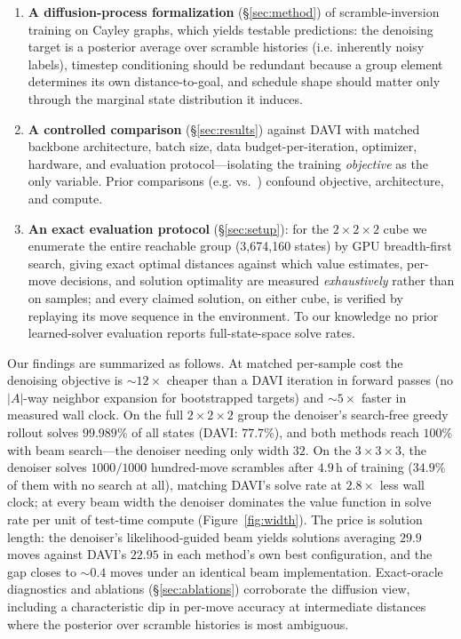 \documentclass[11pt]{article}
\newcommand{\ie}{i.e.}
\newcommand{\eg}{e.g.}
\begin{document}
\begin{enumerate}
\item \textbf{A diffusion-process formalization} (\S\ref{sec:method}) of
scramble-inversion training on Cayley graphs, which yields testable
predictions: the denoising target is a posterior average over scramble
histories (\ie{} inherently noisy labels), timestep conditioning should be
redundant because a group element determines its own distance-to-goal, and
schedule shape should matter only through the marginal state distribution it
induces.
\item \textbf{A controlled comparison} (\S\ref{sec:results}) against DAVI with
matched backbone architecture, batch size, data budget-per-iteration,
optimizer, hardware, and evaluation protocol---isolating the training
\emph{objective} as the only variable. Prior comparisons (\eg{}
\citealp{takano2023} vs.\ \citealp{agostinelli2019}) confound objective,
architecture, and compute.
\item \textbf{An exact evaluation protocol} (\S\ref{sec:setup}): for the
$2{\times}2{\times}2$ cube we enumerate the entire reachable group
(3{,}674{,}160 states) by GPU breadth-first search, giving exact optimal
distances against which value estimates, per-move decisions, and solution
optimality are measured \emph{exhaustively} rather than on samples; and every
claimed solution, on either cube, is verified by replaying its move sequence
in the environment. To our knowledge no prior learned-solver evaluation
reports full-state-space solve rates.
\end{enumerate}

Our findings are summarized as follows. At matched per-sample cost the
denoising objective is ${\sim}12\times$ cheaper than a DAVI iteration in
forward passes (no $|A|$-way neighbor expansion for bootstrapped targets) and
${\sim}5\times$ faster in measured wall clock. On the full
$2{\times}2{\times}2$ group the denoiser's search-free greedy rollout solves
$99.989\%$ of all states (DAVI: $77.7\%$), and both methods reach $100\%$ with
beam search---the denoiser needing only width $32$. On the
$3{\times}3{\times}3$, the denoiser solves $1000/1000$ hundred-move scrambles
after $4.9$\,h of training ($34.9\%$ of them with no search at all), matching
DAVI's solve rate at $2.8\times$ less wall clock; at every beam width the
denoiser dominates the value function in solve rate per unit of test-time
compute (Figure~\ref{fig:width}). The price is solution length: the denoiser's
likelihood-guided beam yields solutions averaging $29.9$ moves against DAVI's
$22.95$ in each method's own best configuration, and the gap closes to
${\sim}0.4$ moves under an identical beam implementation. Exact-oracle
diagnostics and ablations (\S\ref{sec:ablations}) corroborate the diffusion
view, including a characteristic dip in per-move accuracy at intermediate
distances where the posterior over scramble histories is most ambiguous.
\end{document}
